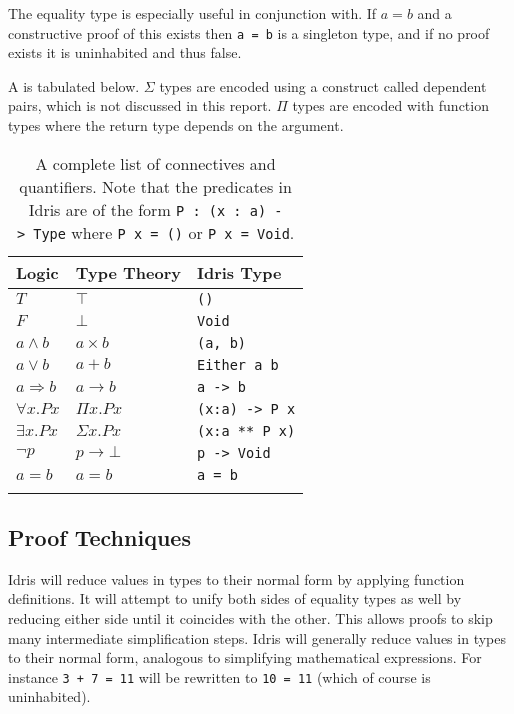 \documentclass[]{report}
\begin{document}
The equality type is especially useful in conjunction with. If $a=b$ and a constructive proof of this exists then \texttt{a = b} is a singleton type, and if no proof exists it is uninhabited and thus false.

A  is tabulated below.  $\Sigma$ types are encoded using a construct called dependent pairs, which is not discussed in this report. $\Pi$ types are encoded with function types where the return type depends on the argument.

\begin{longtable}[]{@{}lll@{}}
	\toprule
	Logic & Type Theory & Idris
	Type \\
	\midrule
	\endhead
	{\(T\)} & {\(\top\)} & \texttt{()} \\
	{\(F\)} & {\(\bot\)} & \texttt{Void} \\
	{\(a \land b\)} & {\(a \times b\)} & \texttt{(a,\ b)} \\
	{\(a \vee b\)} & {\(a + b\)} & \texttt{Either\ a\ b} \\
	{\(a\Rightarrow b\)} & {\(a \rightarrow b\)} &
	\texttt{a\ -\textgreater{}\ b} \\
	{\(\forall x.Px\)} & {\(\Pi x.Px\)} &
	\texttt{(x:a)\ -\textgreater{}\ P\ x} \\
	{\(\exists x.Px\)} & {\(\Sigma x.Px\)} & \texttt{(x:a\ **\ P\ x)} \\
	{\(\neg p\)} & {\(p \rightarrow \bot\)} &
	\texttt{p\ -\textgreater{}\ Void} \\
	{$a=b$} & {$a=b$} & {\texttt{a = b}} \\
	\bottomrule
	\caption{A complete list of connectives and quantifiers. Note that the predicates in Idris are of the form \texttt{P\ :\ (x\ :\ a)\ -\textgreater{}\ Type} where \texttt{P\ x\ =\ ()} or \texttt{P\ x\ =\ Void}.}
\end{longtable}

\subsection{Proof Techniques}

Idris will reduce values in types to their normal form by applying function definitions. It will attempt to unify both sides of equality types as well by reducing either side until it coincides with the other. This allows proofs to skip many intermediate simplification steps. Idris will generally reduce values in types to their normal form, analogous to simplifying mathematical expressions. For instance \texttt{3 + 7 = 11} will be rewritten to \texttt{10 = 11} (which of course is uninhabited).
\end{document}
